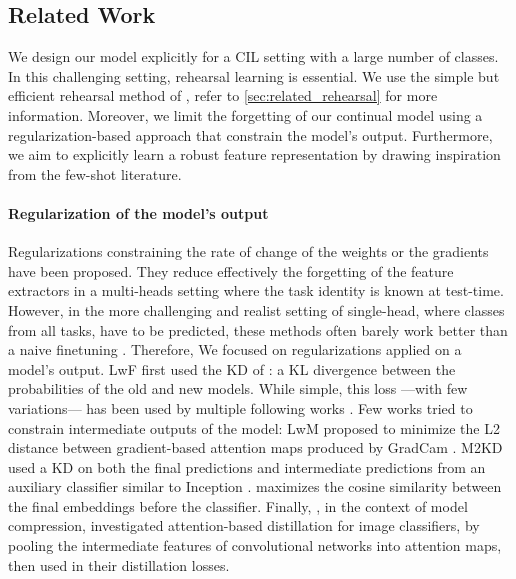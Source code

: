 \subsection{Related Work}
\label{sec:podnet_related}

We design our model explicitly for a \acf{CIL} setting with a large number of classes. In this
challenging setting, rehearsal learning is essential. We use the simple but efficient rehearsal
method of \citet{rebuffi2017icarl}, refer to \autoref{sec:related_rehearsal} for more information.
Moreover, we limit the forgetting of our continual model using a regularization-based approach that
constrain the model's output. Furthermore, we aim to explicitly learn a robust feature
representation by drawing inspiration from the few-shot literature.

\paragraph{Regularization of the model's output} Regularizations constraining the rate of change of
the weights \citep{kirkpatrick2017ewc} or the gradients \citep{farajtabar2020ogd} have been
proposed. They reduce effectively the forgetting of the feature extractors in a multi-heads setting
where the task identity is known at test-time. However, in the more challenging and realist setting
of single-head, where classes from all tasks, have to be predicted, these methods often barely work
better than a naive finetuning \citep{lesort2019regulshortcomings}. Therefore, We focused on
regularizations applied on a model's output. LwF \citep{li2018lwf} first used the \ac{KD} of
\citet{hinton2015knowledge_distillation}: a KL divergence between the probabilities of the old and
new models. While simple, this loss ---with few variations--- has been used by multiple following
works \citep{rebuffi2017icarl,zhao2020weightalignement}. Few works tried to constrain intermediate
outputs of the model: LwM \citep{dhar2019learning_without_memorizing_gradcam} proposed to minimize
the L2 distance between gradient-based attention maps produced by GradCam
\citep{selvaraju2017gradcam}. M2KD \citep{peng2019m2kd} used a \ac{KD} on both the final predictions
and intermediate predictions from an auxiliary classifier similar to Inception
\citep{szegedy2015inception}. \citet{hou2019ucir} maximizes the cosine similarity between the final
embeddings before the classifier. Finally, \citet{zagoruyko2016distillation_attention}, in the
context of model compression, investigated attention-based distillation for image classifiers, by
pooling the intermediate features of convolutional networks into attention maps, then used in their
distillation losses.

